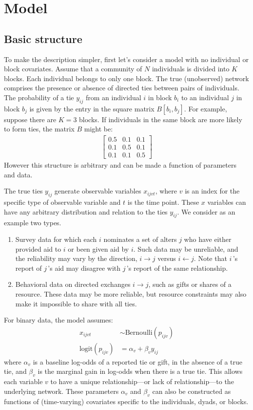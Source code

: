 \documentclass[reqno,12pt,a4paper]{amsart}
\begin{document}
\section{Model}

\subsection{Basic structure}

To make the description simpler, first let's consider a model with no individual or block covariates. Assume that a community of $N$ individuals is divided into $K$ blocks. Each individual belongs to only one block. The true (unobserved) network comprises the presence or absence of directed ties between pairs of individuals. The probability of a tie $y_{ij}$ from an individual $i$ in block $b_i$ to an individual $j$ in block $b_j$ is given by the entry in the square matrix $B[b_i,b_j]$. For example, suppose there are $K=3$ blocks. If individuals in the same block are more likely to form ties, the matrix $B$ might be:
\begin{align*}
\begin{bmatrix}0.5 & 0.1 & 0.1 \\ 0.1 & 0.5 & 0.1 \\ 0.1 & 0.1 & 0.5 \end{bmatrix}
\end{align*}
However this structure is arbitrary and can be made a function of parameters and data.

The true ties $y_{ij}$ generate observable variables $x_{ijvt}$, where $v$ is an index for the specific type of observable variable and $t$ is the time point. These $x$ variables can have any arbitrary distribution and relation to the ties $y_{ij}$. We consider as an example two types.
\begin{enumerate}
\item Survey data for which each $i$ nominates a set of alters $j$ who have either provided aid to $i$ or been given aid by $i$. Such data may be unreliable, and the reliability may vary by the direction, $i \rightarrow j$ versus $i \leftarrow j$. Note that $i$\,'s report of $j$\,'s aid may disagree with $j$\,'s report of the same relationship.
\item Behavioral data on directed exchanges $i \rightarrow j$, such as gifts or shares of a resource. These data may be more reliable, but resource constraints may also make it impossible to share with all ties.
\end{enumerate}
For binary data, the model assumes:
\begin{align*}
	x_{ijvt} &\sim \mathrm{Bernoulli}( p_{ijv} )\\
	\mathrm{logit}(p_{ijv}) &= \alpha_v + \beta_v y_{ij}
\end{align*}
where $\alpha_v$ is a baseline log-odds of a reported tie or gift, in the absence of a true tie, and $\beta_v$ is the marginal gain in log-odds when there is a true tie. This allows each variable $v$ to have a unique relationship---or lack of relationship---to the underlying network. These parameters $\alpha_v$ and $\beta_v$ can also be constructed as functions of (time-varying) covariates specific to the individuals, dyads, or blocks.
\end{document}
